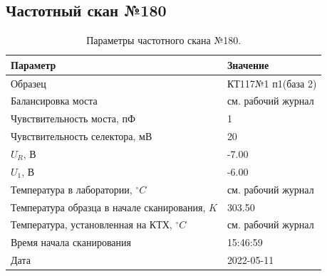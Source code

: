 \subsection{Частотный скан №180}
\begin{table}[!ht]
    \centering
    \caption{Параметры частотного скана №180.}
    \begin{tabular}{|l|l|}
        \hline
        Параметр                                       & Значение                  \\ \hline
        Образец                                        & КТ117№1 п1(база 2)        \\ \hline
        Балансировка моста                             & см. рабочий журнал        \\ \hline
        Чувствительность моста, пФ                     & 1                         \\ \hline
        Чувствительность селектора, мВ                 & 20                        \\ \hline
        $U_R$, В                                       & -7.00                     \\ \hline
        $U_1$, В                                       & -6.00                     \\ \hline
        Температура в лаборатории, $^\circ C$          & см. рабочий журнал        \\ \hline
        Температура образца в начале сканирования, $K$ & 303.50                    \\ \hline
        Температура, установленная на КТХ, $^\circ C$  & см. рабочий журнал        \\ \hline
        Время начала сканирования                      & 15:46:59                  \\ \hline
        Дата                                           & 2022-05-11                \\ \hline
    \end{tabular}
    \label{table:frequency_scan_180}
\end{table}

